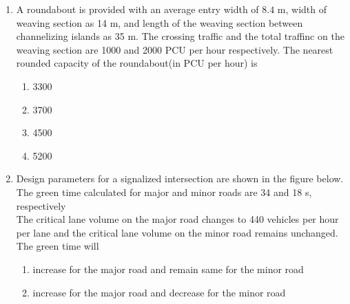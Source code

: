 \documentclass[journal]{IEEEtran}
\begin{document}
\begin{enumerate}
	\item A roundabout is provided with an average entry width of $8.4$ m, width of weaving section as 14 m, and length of the weaving section between channelizing islands as 35 m. The crossing traffic and the total traffinc on the weaving section are 1000 and 2000 PCU per hour respectively. The nearest rounded capacity of the roundabout(in PCU per hour) is
\begin{multicols}{2}
	\begin{enumerate}
		\item 3300
		\item 3700
		\item 4500
		\item 5200
	\end{enumerate}
\end{multicols}	
	\item Design parameters for a signalized intersection are shown in the figure below. The green time calculated for major and minor roads are 34 and 18 s, respectively 
\\
		The critical lane volume on the major road changes to 440 vehicles per hour per lane and the critical lane volume on the minor road remains unchanged. The green time will
\begin{multicols}{2}
	\begin{enumerate}
		\item increase for the major road and remain same for the minor road
		\item increase for the major road and decrease for the minor road


\end{enumerate}
\end{multicols}
\end{enumerate}
\end{document}
